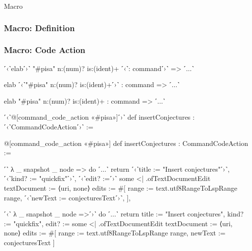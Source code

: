 \begin{frame}[fragile]{Macro} %
  \frametitle<1-2>{Macro: Definition}
  \frametitle<3->{Macro: Code Action}

  \begin{overprint}
    \begin{LeanCodeHL}
      ˹‹˺elab˹›˺ "#pisa" n:(num)? is:(ident)+ ˹‹˺: command˹›˺ => ˹$…$˺
    \end{LeanCodeHL}
    \begin{LeanCodeHL}
      elab ˹‹˺"#pisa" n:(num)? is:(ident)+˹›˺ : command => ˹$…$˺
    \end{LeanCodeHL}
    \begin{LeanCodeHL}
      elab "#pisa" n:(num)? is:(ident)+ : command => ˹$…$˺
    \end{LeanCodeHL}
  \end{overprint}

  \begin{overprint}
    \begin{LeanCodeHL}
      ˹‹˺@[command_code_action «#pisa»]˹›˺
      def insertConjectures : ˹‹˺CommandCodeAction˹›˺ :=
    \end{LeanCodeHL}

    \begin{LeanCodeHL}
      @[command_code_action «#pisa»]
      def insertConjectures : CommandCodeAction :=
    \end{LeanCodeHL}
  \end{overprint}


  \begin{overprint}
    \begin{LeanCodeHL}
      ˹˺  λ _ snapshot _ node => do
          ˹$…$˺
          return {
            ˹‹˺title := "Insert conjectures"˹›˺,
            ˹‹˺kind? := "quickfix"˹›˺,
            ˹‹˺edit? :=˹›˺ some <| .ofTextDocumentEdit {
              textDocument := ⟨uri, none⟩
              edits := #[ {
                range := text.utf8RangeToLspRange range,
                ˹‹˺newText := conjecturesText˹›˺,
              } ],
            }
          }
    \end{LeanCodeHL}

    \begin{LeanCodeHL}
      ˹‹˺  λ _ snapshot _ node =>˹›˺ do
          ˹$…$˺
          return {
            title := "Insert conjectures",
            kind? := "quickfix",
            edit? := some <| .ofTextDocumentEdit {
              textDocument := ⟨uri, none⟩
              edits := #[ {
                range := text.utf8RangeToLspRange range,
                newText := conjecturesText
              } ]
            }
          }
    \end{LeanCodeHL}
  \end{overprint}
\end{frame}

